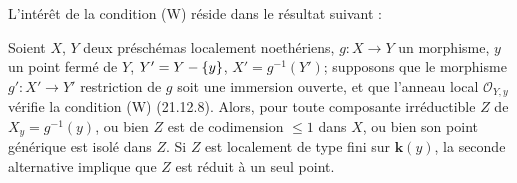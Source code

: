 L'intérêt de la condition (W) réside dans le résultat suivant :

\begin{proposition}[21.12.10]
\label{IV.21.12.10}
Soient $X$, $Y$ deux préschémas localement noethériens, $g:X\to Y$ un morphisme,
$y$ un point fermé de $Y$, $Y'=Y-\{y\}$, $X'=g^{-1}(Y')$; supposons que le morphisme
$g':X'\to Y'$ restriction de $g$ soit une immersion ouverte, et que l'anneau local
$\mathcal O_{Y,y}$ vérifie la condition \textup{(W) (21.12.8)}. Alors, pour toute composante
irréductible $Z$ de $X_y=g^{-1}(y)$, \textup{ou bien} $Z$ est de codimension $\leq1$ dans $X$,
\textup{ou bien} son point générique est isolé dans $Z$. Si $Z$ est localement de type fini sur
$\boldsymbol{k}(y)$, la seconde alternative implique que $Z$ est réduit à un seul point.
\end{proposition}

